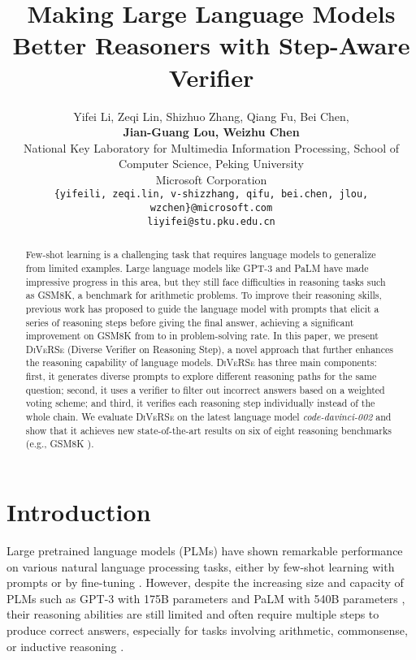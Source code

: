 \documentclass[11pt,a4paper]{article}
\title{Making Large Language Models Better Reasoners with Step-Aware Verifier}
\author{Yifei Li\Thanks{Work was done during an internship at Microsoft Research Asia.}, Zeqi Lin, Shizhuo Zhang, Qiang Fu, Bei Chen, \\
\textbf{Jian-Guang Lou}\textbf{, Weizhu Chen} \\
 National Key Laboratory for Multimedia Information Processing, School of Computer Science, Peking University \\
 Microsoft Corporation \\
\small{{\texttt{\{yifeili, zeqi.lin, v-shizzhang, qifu, bei.chen, jlou, wzchen\}@microsoft.com}}} \\
\small{{\texttt{liyifei@stu.pku.edu.cn}}} \\
}
\date{}
\begin{document}
\maketitle
\begin{abstract}



Few-shot learning is a challenging task that requires language models to generalize from limited examples. Large language models like GPT-3 and PaLM have made impressive progress in this area, but they still face difficulties in reasoning tasks such as GSM8K, a benchmark for arithmetic problems. To improve their reasoning skills, previous work has proposed to guide the language model with prompts that elicit a series of reasoning steps before giving the final answer, achieving a significant improvement on GSM8K from  to  in problem-solving rate. In this paper, we present \textsc{DiVeRSe} (Diverse Verifier on Reasoning Step), a novel approach that further enhances the reasoning capability of language models. \textsc{DiVeRSe} has three main components: first, it generates diverse prompts to explore different reasoning paths for the same question; second, it uses a verifier to filter out incorrect answers based on a weighted voting scheme; and third, it verifies each reasoning step individually instead of the whole chain. We evaluate \textsc{DiVeRSe} on the latest language model \emph{code-davinci-002} and show that it achieves new state-of-the-art results on six of eight reasoning benchmarks (e.g., GSM8K ).




\end{abstract}

\section{Introduction}



Large pretrained language models (PLMs) have shown remarkable performance on various natural language processing tasks, either by few-shot learning with prompts \cite{radford2019language,le2021many,jin-etal-2022-good} or by fine-tuning \cite{houlsby2019parameter, hu2021lora, he2022towards}. However, despite the increasing size and capacity of PLMs such as GPT-3 with 175B parameters \cite{brown2020language} and PaLM with 540B parameters \cite{chowdhery2022palm}, their reasoning abilities are still limited and often require multiple steps to produce correct answers, especially for tasks involving arithmetic, commonsense, or inductive reasoning \cite{cobbe2021training}.
\end{document}
